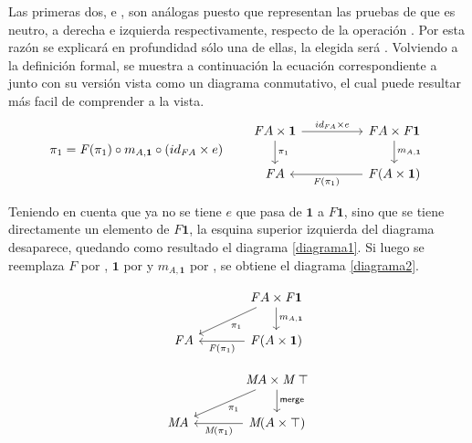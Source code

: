Las primeras dos,  e , son análogas puesto que representan las pruebas de que  es neutro, a derecha e izquierda respectivamente, respecto de la operación . Por esta razón se explicará en profundidad sólo una de ellas, la elegida será . Volviendo a la definición formal, se muestra a continuación la ecuación correspondiente a  junto con su versión vista como un diagrama conmutativo, el cual puede resultar más facil de comprender a la vista.
\begin{equation*}
\pi_1 = \mathit{F}(\pi_1) \circ m_{A,\mathbf{1}} \circ (id_{\mathit{F}A} \times e) 
\qquad 
\begin{tikzcd}[column sep = huge]
\mathit{F} A \times \mathbf{1} \arrow[d, "\pi_1"] \arrow[r, "id_{\mathit{F} A} \times e"] & \mathit{F} A \times \mathit{F} \mathbf{1} \arrow[d, "m_{A,\mathbf{1}}"]  \\
\mathit{F} A & \mathit{F} (A \times \mathbf{1}) \arrow[l, "\mathit{F}(\pi_1)"]
\end{tikzcd}
\end{equation*}

Teniendo en cuenta que ya no se tiene $e$ que pasa de $\mathbf{1}$ a $\mathit{F} \mathbf{1}$, sino que se tiene directamente un elemento de $\mathit{F} \mathbf{1}$, la esquina superior izquierda del diagrama desaparece, quedando como resultado el diagrama \ref{diagrama1}. Si luego se reemplaza $\mathit{F}$ por , $\mathbf{1}$ por \AgdaDatatype{$\top$} y $m_{A,\mathbf{1}}$ por , se obtiene el diagrama \ref{diagrama2}. 
\vspace{-1.25\baselineskip}

\begin{multicols}{2}
\begin{equation}\label{diagrama1}
\begin{tikzcd}[column sep = large]
& \mathit{F} A \times \mathit{F} \mathbf{1} \arrow[d, "m_{A,\mathbf{1}}"] \arrow[dl, "\pi_1"]  \\
\mathit{F} A & \mathit{F} (A \times \mathbf{1}) \arrow[l, "\mathit{F}(\pi_1)"]
\end{tikzcd}
\end{equation}

\begin{equation}\label{diagrama2}
\begin{tikzcd}[column sep = large]
& \AgdaBound{M} A \times \AgdaBound{M} \ \AgdaDatatype{$\top$} \arrow[d, "\AgdaField{merge}"] \arrow[dl, "\pi_1"]  \\
\AgdaBound{M} A & \AgdaBound{M} (A \times \AgdaDatatype{$\top$}) \arrow[l, "\AgdaBound{M}(\pi_1)"]
\end{tikzcd}
\end{equation}
\end{multicols}

